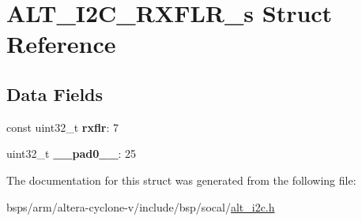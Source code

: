 \hypertarget{structALT__I2C__RXFLR__s}{}\section{A\+L\+T\+\_\+\+I2\+C\+\_\+\+R\+X\+F\+L\+R\+\_\+s Struct Reference}
\label{structALT__I2C__RXFLR__s}
\subsection*{Data Fields}
\begin{DoxyCompactItemize}
\item 
\mbox{\label{structALT__I2C__RXFLR__s_ae8ff4120a322e0a9fad490df56a6cc23}} 
const uint32\+\_\+t {\bfseries rxflr}\+: 7
\item 
\mbox{\label{structALT__I2C__RXFLR__s_a465b61fdab0d52d6ef2d65cdcd21209e}} 
uint32\+\_\+t {\bfseries \+\_\+\+\_\+pad0\+\_\+\+\_\+}\+: 25
\end{DoxyCompactItemize}


The documentation for this struct was generated from the following file\+:\begin{DoxyCompactItemize}
\item 
bsps/arm/altera-\/cyclone-\/v/include/bsp/socal/\mbox{\hyperlink{socal_2alt__i2c_8h}{alt\+\_\+i2c.\+h}}\end{DoxyCompactItemize}
